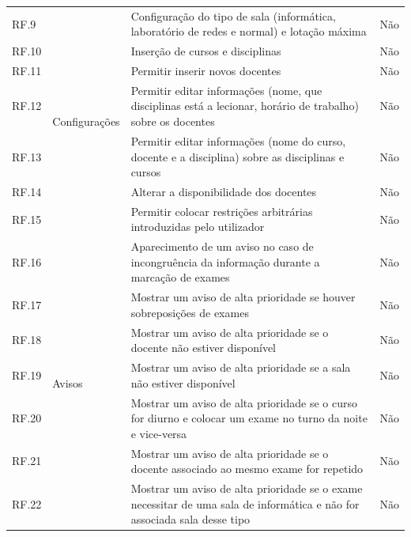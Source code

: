 \documentclass[12pt, twoside]{report}
\begin{document}
\begin{center}
\begin{longtable}{|m{1cm}|m{2.2cm}|m{9cm}|m{3cm}|}
			RF.9 &\multirow{7}{2cm}{Configurações}& Configuração do tipo de sala (informática, laboratório de redes e normal) e lotação máxima & Não \\
			
			RF.10 & & Inserção de cursos e disciplinas & Não\\
			
			RF.11 && Permitir inserir novos docentes & Não\\
			
			RF.12 && Permitir editar informações (nome, que disciplinas está a lecionar, horário de trabalho) sobre os docentes & Não\\
			
			RF.13 && Permitir editar informações (nome do curso, docente e a disciplina) sobre as disciplinas e cursos & Não\\
			
			RF.14 && Alterar a disponibilidade dos docentes & Não\\
			
			RF.15 && Permitir colocar restrições arbitrárias introduzidas pelo utilizador & Não \\
			\hline	
			
			RF.16 &\multirow{9}{2cm}{Avisos}& Aparecimento de um aviso no caso de incongruência da informação durante a marcação de exames & Não \\
			
			RF.17 &&Mostrar um aviso de alta prioridade se houver sobreposições de exames & Não\\
			
			RF.18 && Mostrar um aviso de alta prioridade se o docente não estiver disponível & Não \\
			
			RF.19 && Mostrar um aviso de alta prioridade se a sala não estiver disponível & Não\\
			
			RF.20 && Mostrar um aviso de alta prioridade se o curso for diurno e colocar um exame no turno da noite e vice-versa & Não\\
			
			RF.21&&Mostrar um aviso de alta prioridade se o docente associado ao mesmo exame for repetido & Não \\
			
			RF.22 && Mostrar um aviso de alta prioridade se o exame necessitar de uma sala de informática e não for associada sala desse tipo & Não\\
			

\end{longtable}
\end{center}
\end{document}
